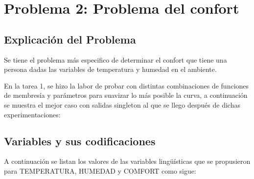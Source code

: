 \documentclass[11pt, letterpaper]{article}
\begin{document}
\newpage

\section{Problema 2: Problema del confort}

\subsection{Explicación del Problema}

Se tiene el problema más especifico de determinar el confort que tiene una persona dadas las variables  de temperatura y humedad en el ambiente.

En la tarea 1, se hizo la labor de probar con distintas combinaciones de funciones de membresía y parámetros para suavizar lo más posible la curva, a continuación se muestra el mejor caso con salidas singleton al que se llego después de dichas experimentaciones:

\subsection{Variables y sus codificaciones}

A continuación se listan los valores de las variables lingüísticas que se propusieron para TEMPERATURA, HUMEDAD y COMFORT como sigue:
\end{document}
